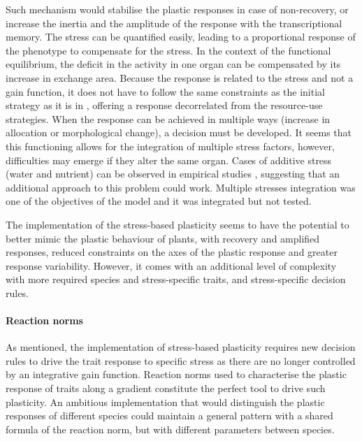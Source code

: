 Such mechanism would stabilise the plastic responses in case of non-recovery, or increase the inertia and the amplitude of the response with the transcriptional memory. The stress can be quantified easily, leading to a proportional response of the phenotype to compensate for the stress. In the context of the functional equilibrium, the deficit in the activity in one organ can be compensated by its increase in exchange area. Because the response is related to the stress and not a gain function, it does not have to follow the same constraints as the initial strategy as it is in \model, offering a response decorrelated from the resource-use strategies. When the response can be achieved in multiple ways (increase in allocation or morphological change), a decision must be developed. It seems that this functioning allows for the integration of multiple stress factors, however, difficulties may emerge if they alter the same organ. Cases of additive stress (water and nutrient) can be observed in empirical studies \parencite{fort_root_2015}, suggesting that an additional approach to this problem could work. Multiple stresses integration \parencite{pierik_art_2014} was one of the objectives of the model \model and it was integrated but not tested.

The implementation of the stress-based plasticity seems to have the potential to better mimic the plastic behaviour of plants, with recovery and amplified responses, reduced constraints on the axes of the plastic response and greater response variability. However, it comes with an additional level of complexity with more required species and stress-specific traits, and stress-specific decision rules.




\paragraph{Reaction norms}

As mentioned, the implementation of stress-based plasticity requires new decision rules to drive the trait response to specific stress as there are no longer controlled by an integrative gain function. Reaction norms used to characterise the plastic response of traits along a gradient constitute the perfect tool to drive such plasticity. An ambitious implementation that would distinguish the plastic responses of different species could maintain a general pattern with a shared formula of the reaction norm, but with different parameters between species.

